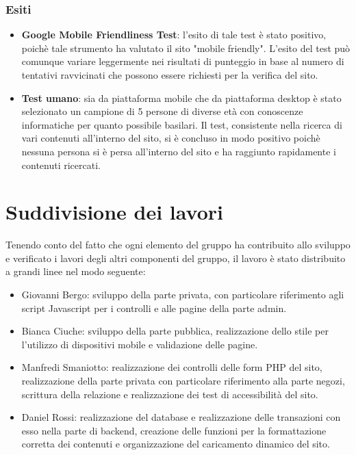 \documentclass[a4paper,12pt]{article}
\begin{document}
\subsubsection{Esiti}
\begin{itemize}
	\item \textbf{Google Mobile Friendliness Test}: l'esito di tale test è stato positivo, poichè tale strumento ha valutato il sito "mobile friendly". L'esito del test può comunque variare leggermente nei risultati di punteggio in base al numero di tentativi ravvicinati che possono essere richiesti per la verifica del sito.
	\item \textbf{Test umano}: sia da piattaforma mobile che da piattaforma desktop è stato selezionato un campione di 5 persone di diverse età con conoscenze informatiche per quanto possibile basilari. Il test, consistente nella ricerca di vari contenuti all'interno del sito, si è concluso in modo positivo poichè nessuna persona si è persa all'interno del sito e ha raggiunto rapidamente i contenuti ricercati.
\end{itemize}
\newpage
\section{Suddivisione dei lavori}
Tenendo conto del fatto che ogni elemento del gruppo ha contribuito allo sviluppo e verificato i lavori degli altri componenti del gruppo, il lavoro è stato distribuito a grandi linee nel modo seguente:
\begin{itemize}
	\item Giovanni Bergo: sviluppo della parte privata, con particolare riferimento agli script Javascript per i controlli e alle pagine della parte admin.
	\item Bianca Ciuche: sviluppo della parte pubblica, realizzazione dello stile per l'utilizzo di dispositivi mobile e validazione delle pagine.
	\item Manfredi Smaniotto: realizzazione dei controlli delle form PHP del sito, realizzazione della parte privata con particolare riferimento alla parte negozi, scrittura della relazione e realizzazione dei test di accessibilità del sito.
	\item Daniel Rossi: realizzazione del database e realizzazione delle transazioni con esso nella parte di backend, creazione delle funzioni per la formattazione corretta dei contenuti e organizzazione del caricamento dinamico del sito.
\end{itemize}
\end{document}

